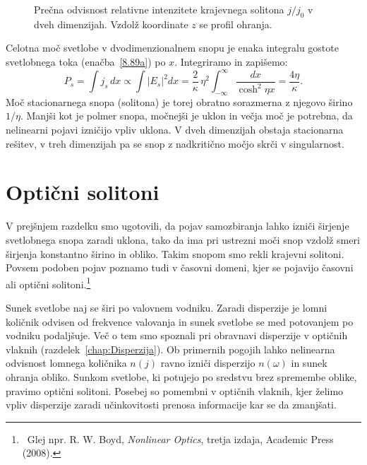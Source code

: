 \begin{figure}[ht]
\centering
\def\svgwidth{105truemm} 

\caption{Prečna odvisnost relativne intenzitete krajevnega solitona $j/j_0$ v dveh dimenzijah. 
Vzdolž koordinate $z$ se profil ohranja.}
\label{fig:soliton}
\end{figure}
Celotna moč svetlobe v dvodimenzionalnem snopu je enaka integralu
gostote svetlobnega toka (enačba~\ref{8.89a}) po $x$. Integriramo in zapišemo:
\begin{equation}
P_s = \int j_s\, dx \propto \int |E_s|^2 dx  = 
\frac{2}{\kappa}\,\eta^{2}\int_{-\infty}^{\infty}\frac{dx}
{\cosh^{2}\eta x}=\frac{4\eta}{\kappa}.
\label{eq:solj}
\end{equation}
Moč stacionarnega snopa (solitona) je torej obratno sorazmerna 
z njegovo širino $1/\eta$. Manjši kot je polmer snopa, močnejši je uklon
in večja moč je potrebna, da nelinearni pojavi izničijo vpliv uklona. 
V dveh dimenzijah obstaja stacionarna rešitev, v treh dimenzijah pa 
se snop z nadkritično močjo skrči v singularnost.

\section{Optični solitoni}
\label{chap:soliton}
V prejšnjem razdelku smo ugotovili, da pojav samozbiranja lahko izniči širjenje 
svetlobnega snopa zaradi uklona, tako da ima pri
ustrezni moči snop vzdolž smeri širjenja konstantno širino in obliko. Takim snopom 
smo rekli krajevni solitoni. Povsem podoben pojav poznamo tudi v časovni 
domeni, kjer se pojavijo časovni ali optični solitoni.\footnote{~Glej npr. R. W. 
Boyd, {\it Nonlinear Optics}, tretja izdaja, Academic Press (2008).}

Sunek svetlobe  naj se širi po valovnem vodniku. Zaradi disperzije je lomni količnik
odvisen od frekvence valovanja in sunek svetlobe se med potovanjem po vodniku podaljšuje. 
Več o tem smo spoznali pri 
obravnavi disperzije v optičnih vlaknih (razdelek~\ref{chap:Disperzija}). 
Ob primernih pogojih lahko nelinearna odvisnost lomnega količnika $n(j)$ 
ravno izniči disperzijo $n(\omega)$ in sunek
ohranja obliko. Sunkom svetlobe, ki potujejo po sredstvu brez spremembe
oblike, pravimo optični solitoni. Posebej so pomembni v optičnih vlaknih, 
kjer želimo  vpliv disperzije zaradi učinkovitosti prenosa
informacije kar se da zmanjšati. 

